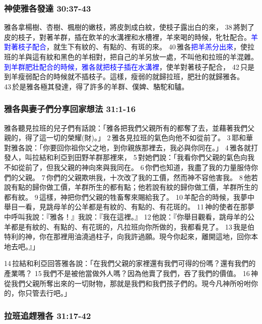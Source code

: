 \subsubsection{神使雅各發達 30:37-43}
雅各拿楊樹、杏樹、楓樹的嫩枝，將皮剝成白紋，使枝子露出白的來， 38 將剝了皮的枝子，對著羊群，插在飲羊的水溝裡和水槽裡，羊來喝的時候，牝牡配合。\textcolor{blue}{羊對著枝子配合}，就生下有紋的、有點的、有斑的來。 
40 雅各\textcolor{blue}{把羊羔分出來}，使拉班的羊與這有紋和黑色的羊相對，把自己的羊另放一處，不叫他和拉班的羊混雜。 
\textcolor{blue}{到羊群肥壯配合的時候，雅各就把枝子插在水溝裡}，使羊對著枝子配合， 42 只是到羊瘦弱配合的時候就不插枝子。這樣，瘦弱的就歸拉班，肥壯的就歸雅各。 43 於是雅各極其發達，得了許多的羊群、僕婢、駱駝和驢。



\noindent 
\subsubsection{雅各與妻子們分享回家想法 31:1-16}
雅各聽見拉班的兒子們有話說：「雅各把我們父親所有的都奪了去，並藉著我們父親的，得了這一切的榮耀(財)。」 2 雅各見拉班的氣色向他不如從前了。 3 耶和華對雅各說：「你要回你祖你父之地，到你親族那裡去，我必與你同在。」 4 雅各就打發人，叫拉結和利亞到田野羊群那裡來，
 5 對她們說：「我看你們父親的氣色向我不如從前了，但我父親的神向來與我同在。 6 你們也知道，我盡了我的力量服侍你們的父親。 7 你們的父親欺哄我，十次改了我的工價，然而神不容他害我。 8 他若說有點的歸你做工價，羊群所生的都有點；他若說有紋的歸你做工價，羊群所生的都有紋。 9 這樣，神把你們父親的牲畜奪來賜給我了。 10 羊配合的時候，我夢中舉目一看，見跳母羊的公羊都是有紋的、有點的、有花斑的。 11 神的使者在那夢中呼叫我說：『雅各！』我說：『我在這裡。』 12 他說：『你舉目觀看，跳母羊的公羊都是有紋的、有點的、有花斑的，凡拉班向你所做的，我都看見了。 13 我是伯特利的神，你在那裡用油澆過柱子，向我許過願。現今你起來，離開這地，回你本地去吧。』」 

14 拉結和利亞回答雅各說：「在我們父親的家裡還有我們可得的份嗎？還有我們的產業嗎？ 15 我們不是被他當做外人嗎？因為他賣了我們，吞了我們的價值。 16 神從我們父親所奪出來的一切財物，那就是我們和我們孩子們的。現今凡神所吩咐你的，你只管去行吧。」



\subsubsection{拉班追趕雅各 31:17-42 }

